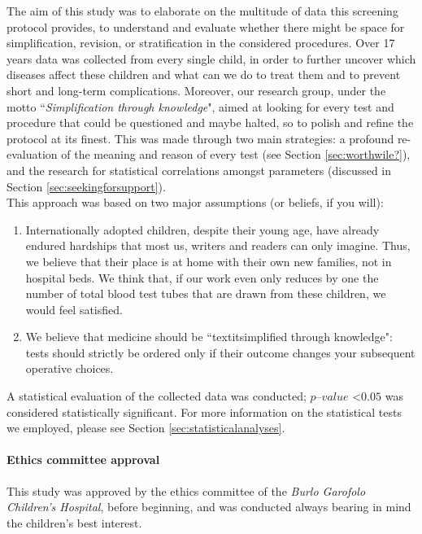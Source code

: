 The aim of this study was to elaborate on the multitude of data this screening protocol provides, to understand and evaluate whether there might be space for simplification, revision, or stratification in the considered procedures. Over 17 years data was collected from every single child, in order to further uncover which diseases affect these children and what can we do to treat them and to prevent short and long-term complications. Moreover, our research group, under the motto ``\textit{Simplification through knowledge}", aimed at looking for every test and procedure that could be questioned and maybe halted, so to polish and refine the protocol at its finest. This was made through two main strategies: a profound re-evaluation of the meaning and reason of every test (see Section \ref{sec:worthwile?}), and the research for statistical correlations amongst parameters (discussed in Section \ref{sec:seekingforsupport}).\\
This approach was based on two major assumptions (or beliefs, if you will):

\begin{enumerate}
	\item Internationally adopted children, despite their young age, have already endured hardships that most us, writers and readers can only imagine. Thus, we believe that their place is at home with their own new families, not in hospital beds. We think that, if our work even only reduces by one the number of total blood test tubes that are drawn from these children, we would feel satisfied.
	\item We believe that medicine should be ``textit{simplified through knowledge}": tests should strictly be ordered only if their outcome changes your subsequent operative choices.
\end{enumerate}

A statistical evaluation of the collected data was conducted; $p–value$ \textless $0.05$ was considered statistically significant. For more information on the statistical tests we employed, please see Section \ref{sec:statisticalanalyses}.

\paragraph*{Ethics committee approval} This study was approved by the ethics committee of the \textit{Burlo Garofolo Children's Hospital}, before beginning, and was conducted always bearing in mind the children's best interest. 

